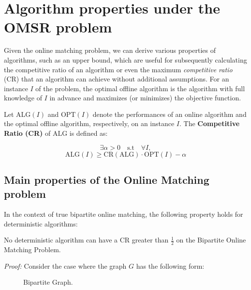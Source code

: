 \documentclass[12pt, twocolumn]{article}
\begin{document}
\section{Algorithm properties under the OMSR problem}

\par
\hspace{\parindent}Given the online matching problem, we can derive various properties of algorithms, such as an upper bound, which are useful for subsequently calculating the competitive ratio of an algorithm or even the maximum \textit{competitive ratio} (CR) that an algorithm can achieve without additional assumptions. For an instance \( I \) of the problem, the optimal offline algorithm is the algorithm with full knowledge of \( I \) in advance and maximizes (or minimizes) the objective function.


\begin{definition}
  Let \( \text{ALG}(I) \) and \( \text{OPT}(I) \) denote the performances of an online algorithm and the optimal offline algorithm, respectively, on an instance \( I \). The \textbf{Competitive Ratio (CR)} of \( \text{ALG} \) is defined as:  

\[  \exists \alpha > 0 \quad \text{s.t} \quad \forall I,\] 
\[\text{ALG}(I) \geq \text{CR}(\text{ALG}) \cdot \text{OPT}(I) - \alpha
\]
\end{definition}


\subsection{Main properties of the Online Matching problem}
\par
\hspace{\parindent}In the context of true bipartite online matching, the following property holds for deterministic algorithms:

\begin{theorem}
    No deterministic algorithm can have a CR greater than $\frac{1}{2}$ on the Bipartite Online Matching Problem.
\end{theorem}
\par
\hspace{\parindent}\textit{Proof:} Consider the case where the graph $G$ has the following form:

\begin{figure}[ht]
\centering
{}
\caption{Bipartite Graph.}
\end{figure}
\end{document}
